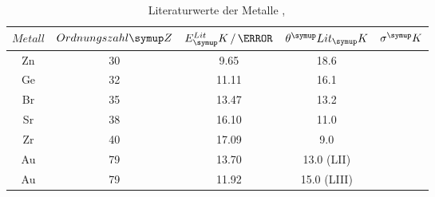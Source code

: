 \begin{table}
  \centering
  \begin{tabular}{c c c c c}
    \toprule
    $Metall$  & $Ordnungszahl \su{Z}$ &
    $E^{Lit}_\su{K} \,/\, \keV$ & $\theta^\su{Lit}_\su{K}$ & $\sigma^\su{K}$ \\
    \midrule
     Zn & 30 & 9.65 & 18.6 &  \\
     Ge & 32 & 11.11 & 16.1 &  \\
     Br & 35 & 13.47 & 13.2 &  \\
     Sr & 38 & 16.10 & 11.0 &  \\
     Zr & 40 & 17.09 & 9.0 &  \\
     Au & 79 & 13.70 & 13.0 (LII) &  \\
     Au & 79 & 11.92 & 15.0 (LIII) &  \\
    \bottomrule
  \end{tabular}
  \caption{Literaturwerte der Metalle \cite{Elit},\,\cite{KAu}}
  \label{tab:info}
\end{table}

